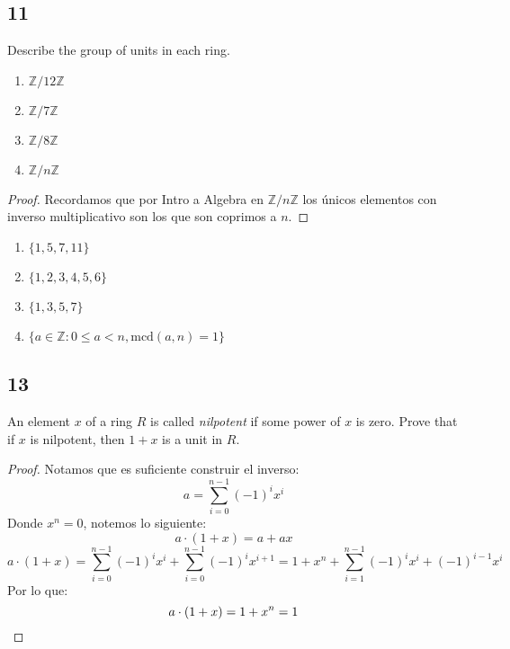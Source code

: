 \documentclass[11pt]{article}
\newcommand{\set}[1]{\mathbb{#1}}
\theoremstyle{definition}
\begin{document}
        \subsection{11}
        Describe the group of units in each ring.
        \begin{enumerate}[label=\textbf{(\alph*)}]
            \item $\set{Z}/12\set{Z}$

            \item $\set{Z}/7\set{Z}$

            \item $\set{Z}/8\set{Z}$

            \item $\set{Z}/n\set{Z}$
        \end{enumerate}
        \begin{proof}
            Recordamos que por Intro a Algebra en $\set{Z}/n\set{Z}$ los únicos elementos con inverso multiplicativo son los que son coprimos a $n$.
        \end{proof}
        \begin{enumerate}[label=\textbf{(\alph*)}]
            \item $\{1,5,7,11\}$

            \item $\{1,2,3,4,5,6\}$

            \item $\{1,3,5,7\}$

            \item $\{a\in\set{Z}:0\leq a<n,\textrm{mcd}(a,n)=1\}$
        \end{enumerate}
        \subsection{13}
        An element $x$ of a ring $R$ is called \textit{nilpotent} if some power of $x$ is zero. Prove that if $x$ is nilpotent, then $1+x$ is a unit in $R$.
        \begin{proof}
            Notamos que es suficiente construir el inverso:
            \[a=\sum^{n-1}_{i=0}(-1)^ix^i\]
            Donde $x^n=0$, notemos lo siguiente:
            \[a\cdot (1+x)=a+ax\]
            \[a\cdot (1+x)=\sum^{n-1}_{i=0}(-1)^ix^i+\sum^{n-1}_{i=0}(-1)^ix^{i+1}=1+x^n+\sum^{n-1}_{i=1}(-1)^ix^i+(-1)^{i-1}x^i\]
            Por lo que:
            \[a\cdot (1+x)=1+x^n=1\qedhere\]
        \end{proof}
\end{document}
